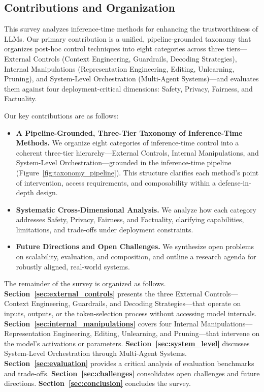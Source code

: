\subsection{Contributions and Organization}
This survey analyzes inference-time methods for enhancing the trustworthiness of LLMs. Our primary contribution is a unified, pipeline-grounded taxonomy that organizes post-hoc control techniques into eight categories across three tiers---External Controls (Context Engineering, Guardrails, Decoding Strategies), Internal Manipulations (Representation Engineering, Editing, Unlearning, Pruning), and System-Level Orchestration (Multi-Agent Systems)---and evaluates them against four deployment-critical dimensions: Safety, Privacy, Fairness, and Factuality.

Our key contributions are as follows:

\begin{itemize}
    \item \textbf{A Pipeline-Grounded, Three-Tier Taxonomy of Inference-Time Methods.} We organize eight categories of inference-time control into a coherent three-tier hierarchy---External Controls, Internal Manipulations, and System-Level Orchestration---grounded in the inference-time pipeline (Figure~\ref{fig:taxonomy_pipeline}). This structure clarifies each method's point of intervention, access requirements, and composability within a defense-in-depth design.
    \item \textbf{Systematic Cross-Dimensional Analysis.} We analyze how each category addresses Safety, Privacy, Fairness, and Factuality, clarifying capabilities, limitations, and trade-offs under deployment constraints.
    \item \textbf{Future Directions and Open Challenges.} We synthesize open problems on scalability, evaluation, and composition, and outline a research agenda for robustly aligned, real-world systems.
\end{itemize}

The remainder of the survey is organized as follows. \textbf{Section~\ref{sec:external_controls}} presents the three External Controls---Context Engineering, Guardrails, and Decoding Strategies---that operate on inputs, outputs, or the token-selection process without accessing model internals. \textbf{Section~\ref{sec:internal_manipulations}} covers four Internal Manipulations---Representation Engineering, Editing, Unlearning, and Pruning---that intervene on the model's activations or parameters. \textbf{Section~\ref{sec:system_level}} discusses System-Level Orchestration through Multi-Agent Systems. \textbf{Section~\ref{sec:evaluation}} provides a critical analysis of evaluation benchmarks and trade-offs. \textbf{Section~\ref{sec:challenges}} consolidates open challenges and future directions. \textbf{Section~\ref{sec:conclusion}} concludes the survey.
